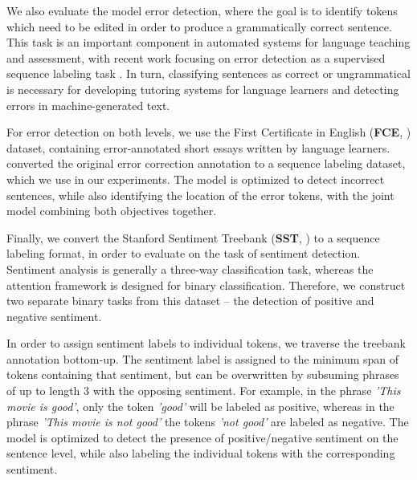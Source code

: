\documentclass[letterpaper]{article} \usepackage{aaai19}  \usepackage{times}  \usepackage{helvet}  \usepackage{courier}  \usepackage{graphicx}
\renewcommand\cite{\citep}	\newcommand\newcite{\citet}
\begin{document}
We also evaluate the model error detection, where the goal is to identify tokens which need to be edited in order to produce a grammatically correct sentence. 
This task is an important component in automated systems for language teaching and assessment, with recent work focusing on error detection as a supervised sequence labeling task \cite{Rei2016,Kaneko2017,Rei2017}.
In turn, classifying sentences as correct or ungrammatical is necessary for developing tutoring systems for language learners \cite{Andersen2013,Daudaravicius2016} and detecting errors in machine-generated text.

For error detection on both levels, we use the First Certificate in English (\textbf{FCE}, \citet{Yannakoudakis2011}) dataset, containing error-annotated short essays written by language learners. 
\citet{Rei2016} converted the original error correction annotation to a sequence labeling dataset, which we use in our experiments.
The model is optimized to detect incorrect sentences, while also identifying the location of the error tokens, with the joint model combining both objectives together.


Finally, we convert the Stanford Sentiment Treebank (\textbf{SST}, \citet{Socher2013}) to a sequence labeling format, in order to evaluate on the task of sentiment detection. Sentiment analysis is generally a three-way classification task, whereas the attention framework is designed for binary classification. Therefore, we construct two separate binary tasks from this dataset -- the detection of positive and negative sentiment.

In order to assign sentiment labels to individual tokens, we traverse the treebank annotation bottom-up. 
The sentiment label is assigned to the minimum span of tokens containing that sentiment, but can be overwritten by subsuming phrases of up to length 3 with the opposing sentiment. For example, in the phrase \textit{'This movie is good'}, only the token \textit{'good'} will be labeled as positive, whereas in the phrase \textit{'This movie is not good'} the tokens \textit{'not good'} are labeled as negative.
The model is optimized to detect the presence of positive/negative sentiment on the sentence level, while also labeling the individual tokens with the corresponding sentiment.
\end{document}
